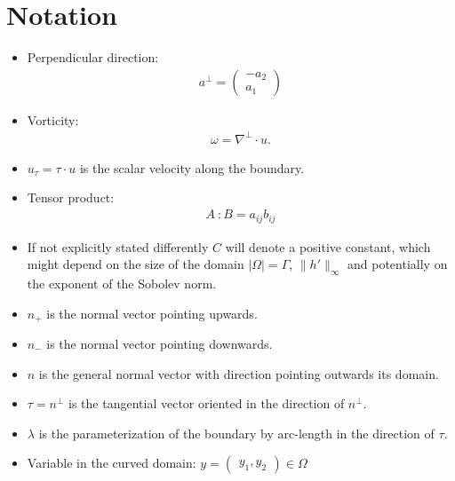 \documentclass{article}
\theoremstyle{definition}
\theoremstyle{definition}
\begin{document}
\section{Notation}
\begin{itemize}
    \item
    Perpendicular direction:
    \begin{align*}
        a^\perp = \begin{pmatrix}-a_2\\a_1\end{pmatrix}
    \end{align*}
    \item
    Vorticity:
    \begin{align*}
        \omega = \nabla^\perp \cdot u.
    \end{align*}
    \item
    $u_\tau = \tau\cdot u$ is the scalar velocity along the boundary.
    \\
    \item
    Tensor product:
    \begin{align*}
        A \ \colon B = a_{ij}b_{ij}
    \end{align*}
    \item
    If not explicitly stated differently $C$ will denote a positive constant, which might depend on the size of the domain $|\Omega|=\Gamma$, $\|h'\|_{\infty}$ and potentially on the exponent of the Sobolev norm.
    \\
    \item
    $n_+$ is the normal vector pointing upwards.
    \\
    \item
    $n_-$ is the normal vector pointing downwards.
    \\
    \item
    $n$ is the general normal vector with direction pointing outwards its domain.
    \\
    \item
    $\tau=n^\perp$ is the tangential vector oriented in the direction of $n^\perp$. 
    \\
    \item
    $\lambda$ is the parameterization of the boundary by arc-length in the direction of $\tau$.
    \\
    \item
    Variable in the curved domain: $y=\begin{pmatrix}y_1,y_2\end{pmatrix}\in \Omega$
    \\

\end{itemize}
\end{document}
